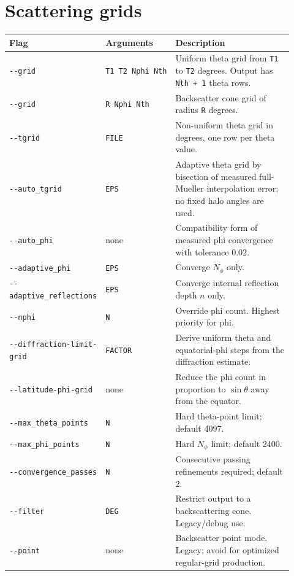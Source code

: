 \documentclass[
  10pt,
  a4paper,
]{article}
\begin{document}
\section{Scattering grids}\label{scattering-grids}

\begin{longtable}[]{@{}L{0.24\linewidth}L{0.22\linewidth}L{0.46\linewidth}@{}}
\toprule\noalign{}
Flag & Arguments & Description \\
\midrule\noalign{}
\endhead
\bottomrule\noalign{}
\endlastfoot
\texttt{-\/-grid} & \texttt{T1\ T2\ Nphi\ Nth} & Uniform theta grid from
\texttt{T1} to \texttt{T2} degrees. Output has \texttt{Nth\ +\ 1} theta
rows. \\
\texttt{-\/-grid} & \texttt{R\ Nphi\ Nth} & Backscatter cone grid of
radius \texttt{R} degrees. \\
\texttt{-\/-tgrid} & \texttt{FILE} & Non-uniform theta grid in degrees,
one row per theta value. \\
\texttt{-\/-auto\_tgrid} & \texttt{EPS} & Adaptive theta grid by
bisection of measured full-Mueller interpolation error; no fixed halo
angles are used. \\
\texttt{-\/-auto\_phi} & none & Compatibility form of measured phi
convergence with tolerance \(0.02\). \\
\texttt{-\/-adaptive\_phi} & \texttt{EPS} & Converge \(N_\phi\) only. \\
\texttt{-\/-adaptive\_reflections} & \texttt{EPS} & Converge internal
reflection depth \(n\) only. \\
\texttt{-\/-nphi} & \texttt{N} & Override phi count. Highest priority
for phi. \\
\texttt{-\/-diffraction-limit-grid} & \texttt{FACTOR} & Derive uniform
theta and equatorial-phi steps from the diffraction estimate. \\
\texttt{-\/-latitude-phi-grid} & none & Reduce the phi count in
proportion to $\sin\theta$ away from the equator. \\
\texttt{-\/-max\_theta\_points} & \texttt{N} & Hard theta-point limit;
default 4097. \\
\texttt{-\/-max\_phi\_points} & \texttt{N} & Hard \(N_\phi\) limit;
default 2400. \\
\texttt{-\/-convergence\_passes} & \texttt{N} & Consecutive passing
refinements required; default 2. \\
\texttt{-\/-filter} & \texttt{DEG} & Restrict output to a backscattering
cone. Legacy/debug use. \\
\texttt{-\/-point} & none & Backscatter point mode. Legacy; avoid for
optimized regular-grid production. \\
\end{longtable}
\end{document}
